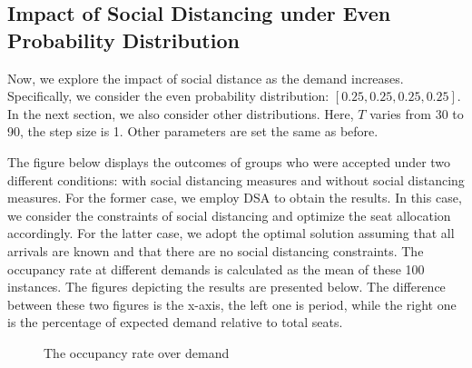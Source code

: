 \subsection{Impact of Social Distancing under Even Probability Distribution}
Now, we explore the impact of social distance as the demand increases. Specifically, we consider the even probability distribution: $[0.25, 0.25, 0.25, 0.25]$. In the next section, we also consider other 
distributions. Here, $T$ varies from 30 to 90, the step size is 1. Other parameters are set the same as before.




The figure below displays the outcomes of groups who were accepted under two different conditions: with social distancing measures and without social distancing measures. For the former case, we employ DSA to obtain the results. In this case, we consider the constraints of social distancing and optimize the seat allocation accordingly. For the latter case, we adopt the optimal solution assuming that all arrivals are known and that there are no social distancing constraints. The occupancy rate at different demands is calculated as the mean of these 100 instances. The figures depicting the results are presented below. The difference between these two figures is the x-axis, the left one is period, while the right one is the percentage of expected demand relative to total seats. 


\begin{figure}[h]
  \centering
  \caption{The occupancy rate over demand}
  \label{Fig.lable}
\end{figure}

